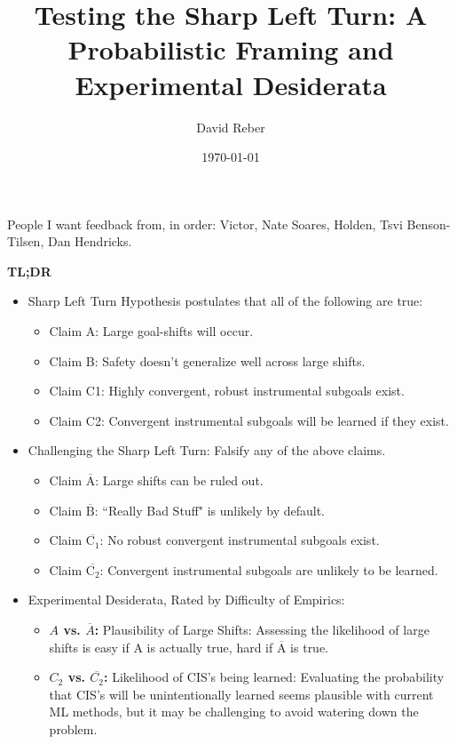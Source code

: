 \documentclass{article}
\title{Testing the Sharp Left Turn: A Probabilistic Framing and Experimental Desiderata}
\author{David Reber}
\date{\today}
\begin{document}
\maketitle


People I want feedback from, in order: Victor, Nate Soares, Holden, Tsvi Benson-Tilsen, Dan Hendricks.

\textbf{TL;DR}
\begin{itemize}
    \item Sharp Left Turn Hypothesis postulates that all of the following are true:
    \begin{itemize}
        \item Claim A: Large goal-shifts will occur.
        \item Claim B: Safety doesn't generalize well across large shifts.
        \item Claim C1: Highly convergent, robust instrumental subgoals exist.
        \item Claim C2: Convergent instrumental subgoals will be learned if they exist.
    \end{itemize}
    \item Challenging the Sharp Left Turn: Falsify any of the above claims.
    \begin{itemize}
        \item Claim $\overline{\text{A}}$: Large shifts can be ruled out.
        \item Claim $\overline{\text{B}}$: ``Really Bad Stuff" is unlikely by default.
        \item Claim $\overline{\text{C}_1}$: No robust convergent instrumental subgoals exist.
        \item Claim $\overline{\text{C}_2}$: Convergent instrumental subgoals are unlikely to be learned.
    \end{itemize}
    \item Experimental Desiderata, Rated by Difficulty of Empirics:
    \begin{itemize}
        \item \textbf{$A$ vs. $\overline{A}$:} Plausibility of Large Shifts: Assessing the likelihood of large shifts is easy if A is actually true, hard if $\overline{\text{A}}$ is true.
        \item \textbf{$C_2$ vs. $\overline{C_2}$:} Likelihood of CIS's being learned: Evaluating the probability that CIS's will be unintentionally learned seems plausible with current ML methods, but it may be challenging to avoid watering down the problem.

\end{itemize}
\end{itemize}
\end{document}
